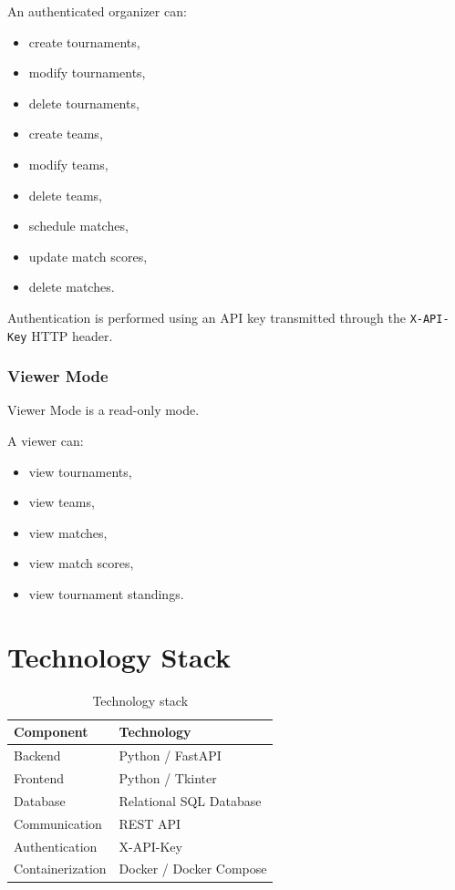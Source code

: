 \documentclass[12pt,a4paper]{article}
\begin{document}
An authenticated organizer can:

\begin{itemize}
    \item create tournaments,
    \item modify tournaments,
    \item delete tournaments,
    \item create teams,
    \item modify teams,
    \item delete teams,
    \item schedule matches,
    \item update match scores,
    \item delete matches.
\end{itemize}

Authentication is performed using an API key transmitted through
the \texttt{X-API-Key} HTTP header.

\subsubsection{Viewer Mode}

Viewer Mode is a read-only mode.

A viewer can:

\begin{itemize}
    \item view tournaments,
    \item view teams,
    \item view matches,
    \item view match scores,
    \item view tournament standings.
\end{itemize}


\section{Technology Stack}

\begin{table}[H]
\centering
\begin{tabular}{ll}
\toprule
\textbf{Component} & \textbf{Technology} \\
\midrule
Backend & Python / FastAPI \\
Frontend & Python / Tkinter \\
Database & Relational SQL Database \\
Communication & REST API \\
Authentication & X-API-Key \\
Containerization & Docker / Docker Compose \\
\bottomrule
\end{tabular}
\caption{Technology stack}
\end{table}
\end{document}
